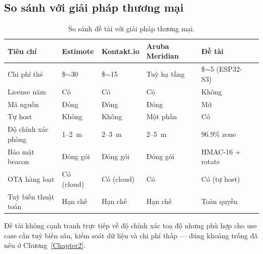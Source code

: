 \subsection{So sánh với giải pháp thương mại}

\begin{table}[htp]
    \centering
    \caption{So sánh đề tài với giải pháp thương mại.}
    \label{tab:compare-commercial}
    \begin{tabular}{llllll}
        \hline
        \textbf{Tiêu chí} & \textbf{Estimote} & \textbf{Kontakt.io} & \textbf{Aruba Meridian} & \textbf{Đề tài} \\
        \hline
        Chi phí thẻ           & \$$\sim$30 & \$$\sim$15 & Tuỳ hạ tầng & \$$\sim$5 (ESP32-S3) \\
        License năm           & Có         & Có          & Có         & Không \\
        Mã nguồn              & Đóng       & Đóng        & Đóng       & Mở \\
        Tự host               & Không      & Không       & Một phần   & Có \\
        Độ chính xác phòng    & 1--2~m     & 2--3~m      & 2--5~m     & 96.9\% zone \\
        Bảo mật beacon        & Đóng gói   & Đóng gói    & Đóng gói   & HMAC-16 + rotate \\
        OTA hàng loạt         & Có (cloud) & Có (cloud)  & Có         & Có (tự host) \\
        Tuỳ biến thuật toán   & Hạn chế    & Hạn chế     & Hạn chế    & Toàn quyền \\
        \hline
    \end{tabular}
\end{table}

Đề tài không cạnh tranh trực tiếp về độ chính xác toạ độ nhưng phù hợp cho use case cần tuỳ biến sâu, kiểm soát dữ liệu và chi phí thấp — đúng khoảng trống đã nêu ở Chương~\ref{Chapter2}.
